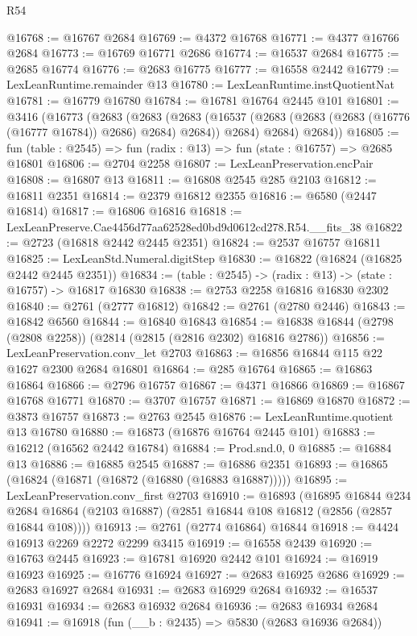 \begin{lexlean}{R54}
\begin{coremodule}
@16768 := @16767 @2684
@16769 := @4372 @16768
@16771 := @4377 @16766 @2684
@16773 := @16769 @16771 @2686
@16774 := @16537 @2684
@16775 := @2685 @16774
@16776 := @2683 @16775
@16777 := @16558 @2442
@16779 := LexLeanRuntime.remainder @13
@16780 := LexLeanRuntime.instQuotientNat
@16781 := @16779 @16780
@16784 := @16781 @16764 @2445 @101
@16801 := @3416
    (@16773
      (@2683
        (@2683
          (@2683 (@16537 (@2683 (@2683 (@2683 (@16776 (@16777 @16784)) @2686) @2684) @2684)) @2684)
          @2684)
        @2684))
@16805 := fun (table : @2545) => fun (radix : @13) => fun (state : @16757) => @2685 @16801
@16806 := @2704 @2258
@16807 := LexLeanPreservation.encPair
@16808 := @16807 @13
@16811 := @16808 @2545 @285 @2103
@16812 := @16811 @2351
@16814 := @2379 @16812 @2355
@16816 := @6580 (@2447 @16814)
@16817 := @16806 @16816
@16818 := LexLeanPreserve.Cae4456d77aa62528ed0bd9d0612cd278.R54.__fits_38
@16822 := @2723 (@16818 @2442 @2445 @2351)
@16824 := @2537 @16757 @16811
@16825 := LexLeanStd.Numeral.digitStep
@16830 := @16822 (@16824 (@16825 @2442 @2445 @2351))
@16834 := (table : @2545) -> (radix : @13) -> (state : @16757) -> @16817 @16830
@16838 := @2753 @2258 @16816 @16830 @2302
@16840 := @2761 (@2777 @16812)
@16842 := @2761 (@2780 @2446)
@16843 := @16842 @6560
@16844 := @16840 @16843
@16854 := @16838 @16844 (@2798 (@2808 @2258)) (@2814 (@2815 (@2816 @2302) @16816 @2786))
@16856 := LexLeanPreservation.conv_let @2703
@16863 := @16856 @16844 @115 @22 @1627 @2300 @2684 @16801
@16864 := @285 @16764
@16865 := @16863 @16864
@16866 := @2796 @16757
@16867 := @4371 @16866
@16869 := @16867 @16768 @16771
@16870 := @3707 @16757
@16871 := @16869 @16870
@16872 := @3873 @16757
@16873 := @2763 @2545
@16876 := LexLeanRuntime.quotient @13 @16780
@16880 := @16873 (@16876 @16764 @2445 @101)
@16883 := @16212 (@16562 @2442 @16784)
@16884 := Prod.snd.{0, 0}
@16885 := @16884 @13
@16886 := @16885 @2545
@16887 := @16886 @2351
@16893 := @16865 (@16824 (@16871 (@16872 (@16880 (@16883 @16887)))))
@16895 := LexLeanPreservation.conv_first @2703
@16910 := @16893
    (@16895
      @16844
      @234
      @2684
      @16864
      (@2103 @16887)
      (@2851 @16844 @108 @16812 (@2856 (@2857 @16844 @108))))
@16913 := @2761 (@2774 @16864) @16844
@16918 := @4424 @16913 @2269 @2272 @2299 @3415
@16919 := @16558 @2439
@16920 := @16763 @2445
@16923 := @16781 @16920 @2442 @101
@16924 := @16919 @16923
@16925 := @16776 @16924
@16927 := @2683 @16925 @2686
@16929 := @2683 @16927 @2684
@16931 := @2683 @16929 @2684
@16932 := @16537 @16931
@16934 := @2683 @16932 @2684
@16936 := @2683 @16934 @2684
@16941 := @16918 (fun (__b : @2435) => @5830 (@2683 @16936 @2684))

\end{coremodule}
\end{lexlean}
